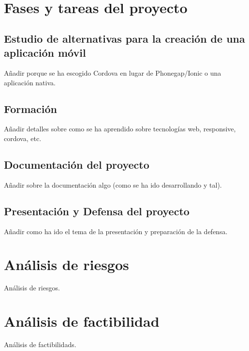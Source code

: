 
\section{Fases y tareas del proyecto}

\subsection{Estudio de alternativas para la creación de una aplicación móvil}

Añadir porque se ha escogido Cordova en lugar de Phonegap/Ionic o una aplicación nativa.\\

\subsection{Formación}

Añadir detalles sobre como se ha aprendido sobre tecnologías web, responsive, cordova, etc.\\

\subsection{Documentación del proyecto}

Añadir sobre la documentación algo (como se ha ido desarrollando y tal).\\

\subsection{Presentación y Defensa del proyecto}

Añadir como ha ido el tema de la presentación y preparación de la defensa.\\


\section{Análisis de riesgos}

Análisis de riesgos.\\



\section{Análisis de factibilidad}

Análisis de factibilidads.\\